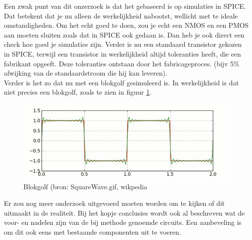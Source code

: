 \documentclass{report}
\begin{document}
Een zwak punt van dit onzerzoek is dat het gebaseerd is op simulaties in SPICE. Dat betekent dat je nu alleen de werkelijkheid nabootst, wellicht met te ideale omstandigheden. Om het echt goed te doen, zou je echt een NMOS en een PMOS aan moeten sluiten zoals dat in SPICE ook gedaan is. Dan heb je ook direct een check hoe goed je simulaties zijn. Verder is nu een standaard transistor gekozen in SPICE, terwijl  een transistor in werkelijkheid altijd toleranties heeft, die een fabrikant opgeeft. Deze toleranties ontstaan door het fabricageproces. (bijv 5\% afwijking van de standaardstroom die hij kan leveren). \\
Verder is het zo dat nu met een blokgolf gesimuleerd is. In werkelijkheid is dat niet precies een blokgolf, zoals te zien in figuur \ref{d1}. 
\begin{figure} [h!]
\includegraphics[scale = 0.5] {inputfiles/sw.jpg}
\caption{Blokgolf (bron: SquareWave.gif, wikpedia}
\label{d1}
\end{figure}
Er zou nog meer onderzoek uitgevoerd moeten worden om te kijken of dit uitmaakt in de realiteit. Bij het kopje conclusies wordt ook al beschreven wat de voor- en nadelen zijn van de bij methode genoemde circuits. Een aanbeveling is om dit ook eens met bestaande componenten uit te voeren. 
\end{document}
